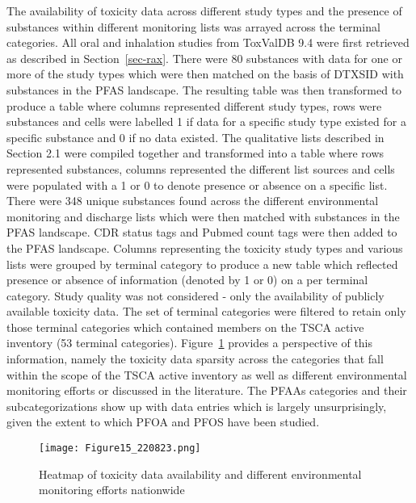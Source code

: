 \documentclass[
  super,
  preprint,
  3p]{elsarticle}
\begin{document}
The availability of toxicity data across different study types and the
presence of substances within different monitoring lists was arrayed
across the terminal categories. All oral and inhalation studies from
ToxValDB 9.4 were first retrieved as described in Section~\ref{sec-rax}.
There were 80 substances with data for one or more of the study types
which were then matched on the basis of DTXSID with substances in the
PFAS landscape. The resulting table was then transformed to produce a
table where columns represented different study types, rows were
substances and cells were labelled 1 if data for a specific study type
existed for a specific substance and 0 if no data existed. The
qualitative lists described in Section 2.1 were compiled together and
transformed into a table where rows represented substances, columns
represented the different list sources and cells were populated with a 1
or 0 to denote presence or absence on a specific list. There were 348
unique substances found across the different environmental monitoring
and discharge lists which were then matched with substances in the PFAS
landscape. CDR status tags and Pubmed count tags were then added to the
PFAS landscape. Columns representing the toxicity study types and
various lists were grouped by terminal category to produce a new table
which reflected presence or absence of information (denoted by 1 or 0)
on a per terminal category. Study quality was not considered - only the
availability of publicly available toxicity data. The set of terminal
categories were filtered to retain only those terminal categories which
contained members on the TSCA active inventory (53 terminal categories).
Figure~\ref{fig-hm-tscaact} provides a perspective of this information,
namely the toxicity data sparsity across the categories that fall within
the scope of the TSCA active inventory as well as different
environmental monitoring efforts or discussed in the literature. The
PFAAs categories and their subcategorizations show up with data entries
which is largely unsurprisingly, given the extent to which PFOA and PFOS
have been studied.

\begin{figure}

{\centering \texttt{[image: Figure15\_220823.png]}

}

\caption{\label{fig-hm-tscaact}Heatmap of toxicity data availability and
different environmental monitoring efforts nationwide}

\end{figure}
\end{document}
